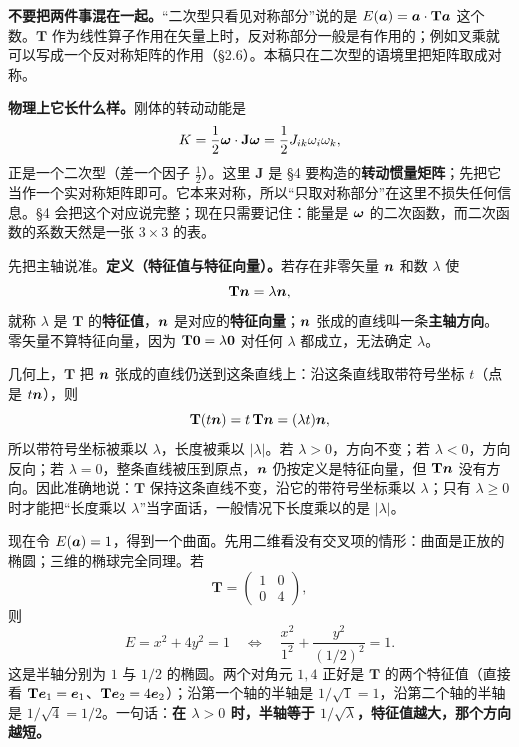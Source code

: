\documentclass[11pt]{ctexart}
\newcommand{\ten}[1]{\mathbf{#1}}
\let\origsubhdr\subhdr
\renewcommand{\subhdr}[1]{\par\needspace{3\baselineskip}\origsubhdr{#1}}
\begin{document}
\textbf{不要把两件事混在一起。}“二次型只看见对称部分”说的是 $E(\vect a)=\vect a\cdot\ten T\vect a$ 这个数。$\ten T$ 作为线性算子作用在矢量上时，反对称部分一般是有作用的；例如叉乘就可以写成一个反对称矩阵的作用（\S2.6）。本稿只在二次型的语境里把矩阵取成对称。

\textbf{物理上它长什么样。}刚体的转动动能是
\[
K=\frac12\vect\omega\cdot\ten J\vect\omega
=\frac12J_{ik}\omega_i\omega_k,
\]
正是一个二次型（差一个因子 $\frac12$）。这里 $\ten J$ 是 \S4 要构造的\textbf{转动惯量矩阵}；先把它当作一个实对称矩阵即可。它本来对称，所以“只取对称部分”在这里不损失任何信息。\S4 会把这个对应说完整；现在只需要记住：能量是 $\boldsymbol{\omega}$ 的二次函数，而二次函数的系数天然是一张 $3\times3$ 的表。

\label{subsec:ellipsoid}

先把主轴说准。\textbf{定义（特征值与特征向量）。}若存在非零矢量 $\boldsymbol{n}$ 和数 $\lambda$ 使
\[
\ten T\vect n=\lambda\vect n,
\]
就称 $\lambda$ 是 $\ten T$ 的\textbf{特征值}，$\boldsymbol{n}$ 是对应的\textbf{特征向量}；$\boldsymbol{n}$ 张成的直线叫一条\textbf{主轴方向}。零矢量不算特征向量，因为 $\ten T\vect0=\lambda\vect0$ 对任何 $\lambda$ 都成立，无法确定 $\lambda$。

几何上，$\ten T$ 把 $\boldsymbol{n}$ 张成的直线仍送到这条直线上：沿这条直线取带符号坐标 $t$（点是 $t\boldsymbol{n}$），则
\[
\ten T(t\vect n)=t\,\ten T\vect n=(\lambda t)\vect n,
\]
所以带符号坐标被乘以 $\lambda$，长度被乘以 $|\lambda|$。若 $\lambda>0$，方向不变；若 $\lambda<0$，方向反向；若 $\lambda=0$，整条直线被压到原点，$\boldsymbol{n}$ 仍按定义是特征向量，但 $\ten T\vect n$ 没有方向。因此准确地说：$\ten T$ 保持这条直线不变，沿它的带符号坐标乘以 $\lambda$；只有 $\lambda\ge0$ 时才能把“长度乘以 $\lambda$”当字面话，一般情况下长度乘以的是 $|\lambda|$。

现在令 $E(\boldsymbol{a})=1$，得到一个曲面。先用二维看没有交叉项的情形：曲面是正放的椭圆；三维的椭球完全同理。若
\[
\ten T=\begin{pmatrix}1&0\\0&4\end{pmatrix},
\]
则
\[
E=x^2+4y^2=1
\quad\Longleftrightarrow\quad
\frac{x^2}{1^2}+\frac{y^2}{(1/2)^2}=1 .
\]
这是半轴分别为 $1$ 与 $1/2$ 的椭圆。两个对角元 $1,4$ 正好是 $\ten T$ 的两个特征值（直接看 $\ten T\vect e_1=\vect e_1$、$\ten T\vect e_2=4\vect e_2$）；沿第一个轴的半轴是 $1/\sqrt1=1$，沿第二个轴的半轴是 $1/\sqrt4=1/2$。一句话：\textbf{在 $\lambda>0$ 时，半轴等于 $1/\sqrt{\lambda}$，特征值越大，那个方向越短。}
\end{document}
